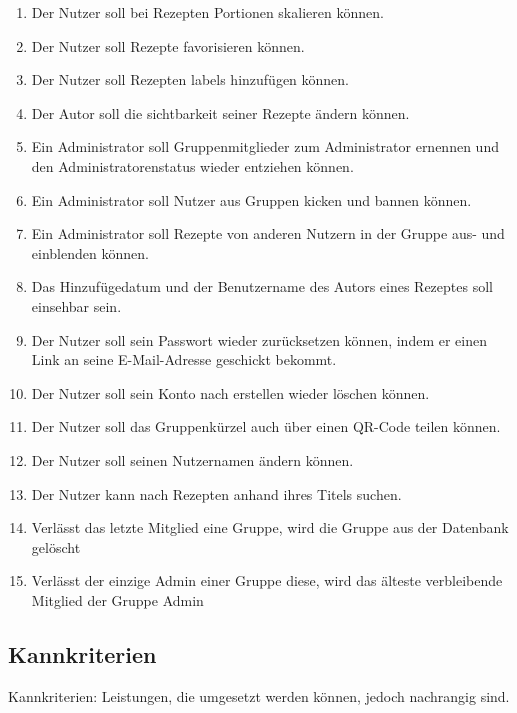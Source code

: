 \documentclass[parskip=full]{scrartcl}
\begin{document}
\begin{enumerate}[start=1,label={$\langle$\bfseries RS\arabic*$\rangle$}, leftmargin = 5em, itemsep=4pt, parsep=4pt]
    \item Der Nutzer soll bei Rezepten Portionen skalieren können.\label{rs:PortionScaling}
    \item Der Nutzer soll Rezepte favorisieren können.\label{rs:RecipeFavourites}
    \item Der Nutzer soll Rezepten \Gls{labels} hinzufügen können.\label{rs:RecipeLabels}
    \item Der Autor soll die \Gls{sichtbarkeit} seiner Rezepte ändern können.\label{rs:RecipeVisibility}
    \item Ein Administrator soll Gruppenmitglieder zum Administrator ernennen und den Administratorenstatus wieder entziehen können.\label{rs:AdminCreation}
    \item Ein Administrator soll Nutzer aus Gruppen \Gls{kicken} und \Gls{bannen} können.\label{rs:Kicking}
    \item Ein Administrator soll Rezepte von anderen Nutzern in der Gruppe aus- und einblenden können.\label{rs:RecipeHiding}
    \item Das Hinzufügedatum und der Benutzername des Autors eines Rezeptes soll einsehbar sein.\label{rs:AuthorAndDate}
    \item Der Nutzer soll sein Passwort wieder zurücksetzen können, indem er einen Link an seine E-Mail-Adresse geschickt bekommt.\label{rs:ResetPassword}
    \item Der Nutzer soll sein Konto nach erstellen wieder löschen können.\label{rs:AccountDeletion}
    \item Der Nutzer soll das Gruppenkürzel auch über einen QR-Code teilen können.\label{rs:QRCode}
    \item Der Nutzer soll seinen Nutzernamen ändern können.\label{rs:ChangeUsername}
    \item Der Nutzer kann nach Rezepten anhand ihres Titels suchen.\label{rs:Searching}
    \item Verlässt das letzte Mitglied eine Gruppe, wird die Gruppe aus der Datenbank gelöscht\label{rs:EmptyGroup}
    \item Verlässt der einzige Admin einer Gruppe diese, wird das älteste verbleibende Mitglied der Gruppe Admin\label{rs:NoAdmins}

\end{enumerate}

\subsection{Kannkriterien}
Kannkriterien: Leistungen, die umgesetzt werden können, jedoch nachrangig sind.
\end{document}
